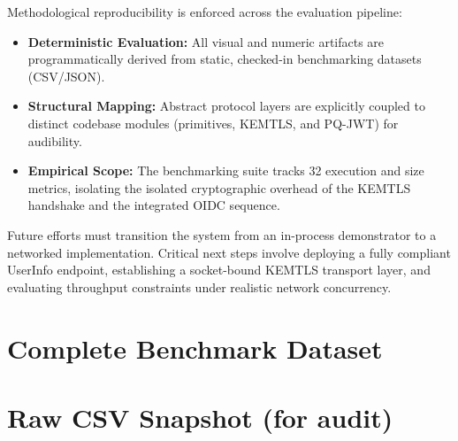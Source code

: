 \documentclass[conference]{IEEEtran}
\begin{document}
                Methodological reproducibility is enforced across the evaluation pipeline:
                \begin{itemize}
                  \item \textbf{Deterministic Evaluation:} All visual and numeric artifacts are programmatically derived from static, checked-in benchmarking datasets (CSV/JSON).
                  \item \textbf{Structural Mapping:} Abstract protocol layers are explicitly coupled to distinct codebase modules (primitives, KEMTLS, and PQ-JWT) for audibility.
                  \item \textbf{Empirical Scope:} The benchmarking suite tracks 32 execution and size metrics, isolating the isolated cryptographic overhead of the KEMTLS handshake and the integrated OIDC sequence.
                \end{itemize}
                Future efforts must transition the system from an in-process demonstrator to a networked implementation. Critical next steps involve deploying a fully compliant UserInfo endpoint, establishing a socket-bound KEMTLS transport layer, and evaluating throughput constraints under realistic network concurrency.
                
                
                
                
                \appendices
                \onecolumn
                \section{Complete Benchmark Dataset}
                \label{app:full-table}
                \begingroup
                \small
                \setlength{\LTleft}{0pt}
                \setlength{\LTright}{0pt}
                
                \endgroup
                
                \section{Raw CSV Snapshot (for audit)}
                \begingroup
                \small
                
                \endgroup
\end{document}
